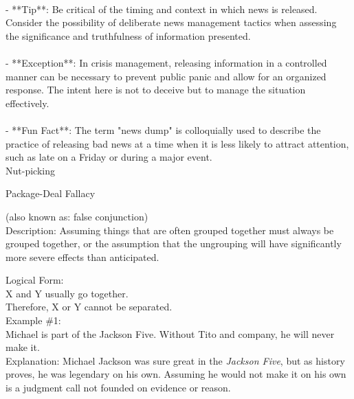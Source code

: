 \documentclass[a4paper,12pt,single,pdftex]{scrbook}
\begin{document}
    
      
    \\

    
      - **Tip**: Be critical of the timing and context in which news is released. Consider the possibility of deliberate news management tactics when assessing the significance and truthfulness of information presented.
    \\

    
      
    \\

    
      - **Exception**: In crisis management, releasing information in a controlled manner can be necessary to prevent public panic and allow for an organized response. The intent here is not to deceive but to manage the situation effectively.
    \\

    
      
    \\

    
      - **Fun Fact**: The term "news dump" is colloquially used to describe the practice of releasing bad news at a time when it is less likely to attract attention, such as late on a Friday or during a major event.
    \\

  

Nut-picking

Package-Deal Fallacy
    
      (also known as: false conjunction)
    \\

  
    Description: Assuming things that are often grouped together must always be grouped together, or the assumption that the ungrouping will have significantly more severe effects than anticipated.

    
      Logical Form:
    \\

    
      X and Y usually go together.
    \\

    
      Therefore, X or Y cannot be separated.
    \\

    
      Example \#1:
    \\

    
      Michael is part of the Jackson Five.  Without Tito and company, he will never make it.
    \\

    
      Explanation: Michael Jackson was sure great in the {\it Jackson Five}, but as history proves, he was legendary on his own.  Assuming he would not make it on his own is a judgment call not founded on evidence or reason.
    \\
\end{document}
